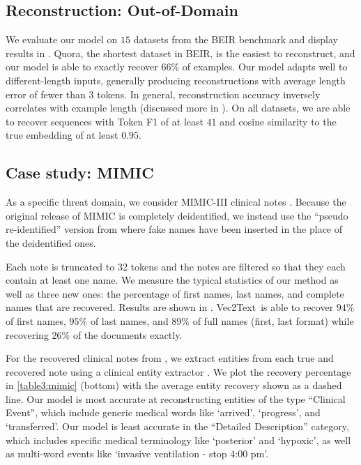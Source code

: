 \documentclass[11pt]{article}
\newcommand{\MethodName}{Vec2Text}
\begin{document}
\subsection{Reconstruction: Out-of-Domain}

We evaluate our model on $15$ datasets from the BEIR benchmark and display results in . Quora, the shortest dataset in BEIR, is the easiest to reconstruct, and our model is able to exactly recover $66\%$ of examples. Our model adapts well to different-length inputs, generally producing reconstructions with average length error of fewer than $3$ tokens. In general, reconstruction accuracy inversely correlates with example length (discussed more in ). On all datasets, we are able to recover sequences with Token F1 of at least $41$ and cosine similarity to the true embedding of at least $0.95$.

\subsection{Case study: MIMIC}
\label{results:mimic}

As a specific threat domain, we consider MIMIC-III clinical notes \cite{johnson2016mimiciii}. Because the original release of MIMIC is completely deidentified, we instead use the ``pseudo re-identified'' version from \citet{lehman2021does} where fake names have been inserted in the place of the deidentified ones.

Each note is truncated to 32 tokens and the notes are filtered so that they each contain at least one name. We measure the typical statistics of our method as well as three new ones: the percentage of first names, last names, and complete names that are recovered. Results are shown in . \MethodName\ is able to recover $94\%$ of first names, $95\%$ of last names, and $89\%$ of full names (first, last format) while recovering $26\%$ of the documents exactly.

For the recovered clinical notes from , we extract entities from each true and recovered note using a clinical entity extractor \cite{raza2022entity}. We plot the recovery percentage in \ref{table3:mimic} (bottom) with the average entity recovery shown as a dashed line. Our model is most accurate at reconstructing entities of the type ``Clinical Event'', which include generic medical words like `arrived', `progress', and `transferred'. Our model is least accurate in the ``Detailed Description'' category, which includes specific medical terminology like `posterior' and `hypoxic', as well as multi-word events like `invasive ventilation - stop 4:00 pm'.
\end{document}
